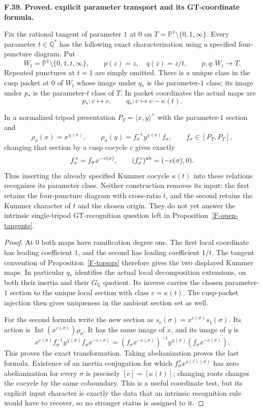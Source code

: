 \documentclass[11pt,oneside]{article}
\makeatletter
\newcounter{statementanchor}
\newenvironment{statement}[3]{%
 \refstepcounter{statementanchor}\def\@currentlabel{#1}%
 \par\addvspace{9pt}\noindent
 \textbf{#1. #2. #3.}\par\nobreak\noindent\ignorespaces
}{\par\addvspace{5pt}}
\makeatother
\begin{document}
\begin{statement}{F.39}{Proved}{explicit parameter transport and its GT-coordinate formula}
\label{st:F.39}
\label{F-tangent-transport}
Fix the rational tangent of parameter $1$ at $0$ on
$T=\mathbb P^1\setminus\{0,1,\infty\}$. Every parameter
$t\in\mathbb Q^*$ has the following exact characterization
using a specified four-puncture diagram. Put
\[
 W_t=\mathbb P^1\setminus\{0,1,t,\infty\},\qquad
 p(z)=z,\quad q(z)=z/t,
 \qquad p,q:W_t\longrightarrow T.
\]
Repeated punctures at $t=1$ are simply omitted. There is a
unique class in the cusp packet at $0$ of $W_t$ whose image
under $q_*$ is the parameter-$1$ class; its image under
$p_*$ is the parameter-$t$ class of $T$. In packet
coordinates the actual maps are
\[
 p_*:c\longmapsto c,\qquad
 q_*:c\longmapsto c-\kappa(t).
\]

In a normalized tripod presentation
$P_T=\langle x,y\rangle^{\wedge}$ with the parameter-$1$
section and
\[
 \rho_\sigma(x)=x^{\chi(\sigma)},\qquad
 \rho_\sigma(y)=f_\sigma^{-1}y^{\chi(\sigma)}f_\sigma,
 \qquad f_\sigma\in[P_T,P_T],
\]
changing that section by a cusp cocycle $c$ gives exactly
\[
 f^{\,c}_\sigma=f_\sigma x^{-c(\sigma)},\qquad
 (f^{\,c}_\sigma)^{\rm ab}=(-c(\sigma),0).
\]
Thus inserting the already specified Kummer cocycle
$\kappa(t)$ into these relations recognizes its parameter
class. Neither construction removes its input: the first
retains the four-puncture diagram with cross-ratio $t$, and
the second retains the Kummer character of $t$ and the
chosen origin. They do not yet answer the intrinsic
single-tripod GT-recognition question left in
Proposition~\ref{F-open-tangents}.
\end{statement}
\begin{proof}
At $0$ both maps have ramification degree one. The first local
coordinate has leading coefficient $1$, and the second has
leading coefficient $1/t$. The tangent convention of
Proposition~\ref{F-torsors} therefore gives the two displayed
Kummer maps. In particular $q_*$ identifies the actual local
decomposition extensions, on both their inertia and their
$G_{\mathbb Q}$ quotient. Its inverse carries the chosen
parameter-$1$ section to the unique local section with class
$c=\kappa(t)$. The cusp-packet injection then gives uniqueness
in the ambient section set as well.

For the second formula write the new section as
$s_c(\sigma)=x^{c(\sigma)}s_1(\sigma)$. Its action is
$\operatorname{Int}(x^{c(\sigma)})\rho_\sigma$. It has the
same image of $x$, and its image of $y$ is
\[
 x^{c(\sigma)}f_\sigma^{-1}y^{\chi(\sigma)}
                   f_\sigma x^{-c(\sigma)}
 = (f_\sigma x^{-c(\sigma)})^{-1}y^{\chi(\sigma)}
                   (f_\sigma x^{-c(\sigma)}).
\]
This proves the exact transformation. Taking abelianization
proves the last formula. Existence of an inertia conjugation
for which $f^{\,c}_\sigma x^{\kappa(t)(\sigma)}$ has zero
abelianization for every $\sigma$ is precisely
$[c]=[\kappa(t)]$; changing roots changes the cocycle by the
same coboundary. This is a useful coordinate test, but its
explicit input character is exactly the data that an intrinsic
recognition rule would have to recover, so no stronger status
is assigned to it.
\end{proof}
\end{document}
